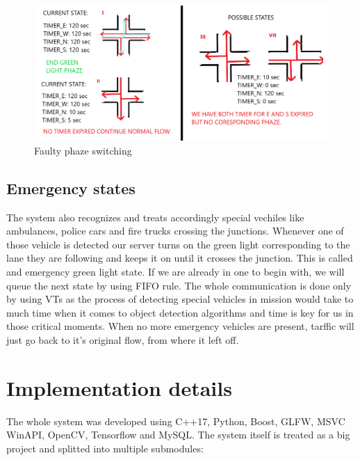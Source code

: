 \documentclass[17pt]{report}
\begin{document}
\begin{figure}[h!]
    \includegraphics[width=\textwidth]{Sketches/PhazeSwitchingCaseToBeAvoided.png}
    \caption{Faulty phaze switching}
    \label{fig:FaultyPhazeSwitching}
\end{figure}

\section{Emergency states}
\indent \indent
The system also recognizes and treats accordingly
special vechiles like ambulances, police cars and fire trucks
crossing the junctions. Whenever one of those vehicle is detected
our server turns on the green light corresponding to the lane they are
following and keeps it on until it crosses the junction. This is called 
and emergency green light state. If we are already
in one to begin with, we will queue the next state by using FIFO rule.
The whole communication is done only by using VTs as the process of detecting 
special vehicles in mission would take to much time when it comes to object 
detection algorithms and time is key for us in those critical moments.
When no more emergency vehicles are present, tarffic will just go 
back to it's original flow, from where it left off.

\pagebreak



\chapter{Implementation details}
\indent \indent
The whole system was developed using C++17, Python, Boost, GLFW, MSVC WinAPI, OpenCV,
Tensorflow  and MySQL. The system itself is treated as a big project 
and splitted into multiple submodules: 
\end{document}
